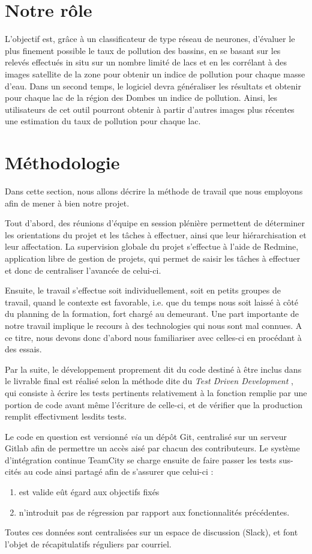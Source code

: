 \documentclass[a4paper, 12pt]{article}
\begin{document}
\section{Notre rôle}
L’objectif est, grâce à un classificateur de type réseau de neurones, d’évaluer le plus finement possible le taux de pollution des bassins, en se basant sur les relevés effectués in situ sur un nombre limité de lacs et en les corrélant à des images satellite de la zone pour obtenir un indice de pollution pour chaque masse d’eau. Dans un second temps, le logiciel devra généraliser les résultats et obtenir pour chaque lac de la région des Dombes un indice de pollution. Ainsi, les utilisateurs de cet outil pourront obtenir à partir d'autres images plus récentes une estimation du taux de pollution pour chaque lac.

\section{Méthodologie}
Dans cette section, nous allons décrire la méthode de travail que nous employons afin de mener à bien notre projet.

Tout d'abord, des réunions d'équipe en session plénière permettent de déterminer les orientations du projet et les tâches à effectuer, ainsi que leur hiérarchisation et leur affectation. La supervision globale du projet s'effectue à l'aide de Redmine, application libre de gestion de projets, qui permet de saisir les tâches à effectuer et donc de centraliser l'avancée de celui-ci.

Ensuite, le travail s'effectue soit individuellement, soit en petits groupes de travail, quand le contexte est favorable, i.e. que du temps nous soit laissé à côté du planning de la formation, fort chargé au demeurant.
Une part importante de notre travail implique le recours à des technologies qui nous sont mal connues. A ce titre, nous devons donc d'abord nous familiariser avec celles-ci en procédant à des essais.

Par la suite, le développement proprement dit du code destiné à être inclus dans le livrable final est réalisé selon la méthode dite du \emph{\og Test Driven Development \fg}, qui consiste à écrire les tests pertinents relativement à la fonction remplie par une portion de code avant même l'écriture de celle-ci, et de vérifier que la production remplit effectivment lesdits tests.

Le code en question est versionné \textit{via} un dépôt Git, centralisé sur un serveur Gitlab afin de permettre un accès aisé par chacun des contributeurs.
Le système d'intégration continue TeamCity se charge ensuite de faire passer les tests sus-cités au code ainsi partagé afin de s'assurer que celui-ci :
\begin{enumerate}
	\item est valide eût égard aux objectifs fixés
	\item n'introduit pas de régression par rapport aux fonctionnalités précédentes.
\end{enumerate}
Toutes ces données sont centralisées sur un espace de discussion (Slack), et font l'objet de récapitulatifs réguliers par courriel.
\end{document}
